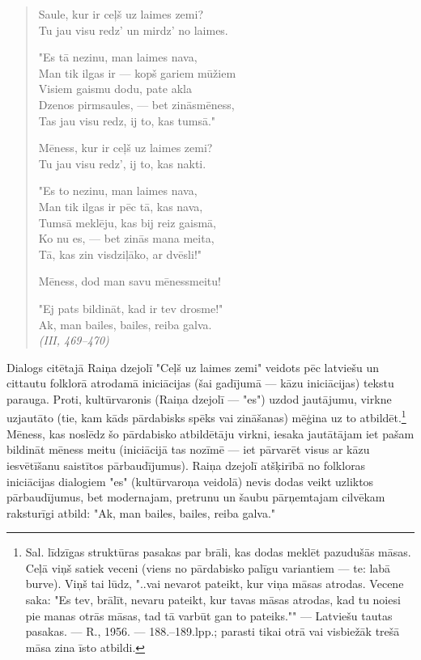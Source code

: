 \documentclass[11pt]{article}
\begin{document}
{\begin{quote}
Saule, kur ir ceļš uz laimes zemi?\\
Tu jau visu redz' un mirdz' no laimes.

"Es tā nezinu, man laimes nava,\\
Man tik ilgas ir --- kopš gariem mūžiem\\
Visiem gaismu dodu, pate akla\\
Dzenos pirmsaules, --- bet zināsmēness,\\
Tas jau visu redz, ij to, kas tumsā."

Mēness, kur ir ceļš uz laimes zemi?\\
Tu jau visu redz', ij to, kas nakti.

"Es to nezinu, man laimes nava,\\
Man tik ilgas ir pēc tā, kas nava,\\
Tumsā meklēju, kas bij reiz gaismā,\\
Ko nu es, --- bet zinās mana meita,\\
Tā, kas zin visdziļāko, ar dvēsli!"

Mēness, dod man savu mēnessmeitu!

"Ej pats bildināt, kad ir tev drosme!"\\
Ak, man bailes, bailes, reiba galva.\\
{\em (III, 469--470)}
\end{quote}

Dialogs citētajā Raiņa dzejolī "Ceļš uz laimes
zemi" veidots pēc latviešu un cittautu folklorā
atrodamā iniciācijas (šai gadījumā --- kāzu
iniciācijas) tekstu parauga. Proti, kultūrvaronis
(Raiņa dzejolī --- "es") uzdod jautājumu,
virkne uzjautāto (tie, kam kāds pārdabisks spēks
vai zināšanas) mēģina uz to atbildēt.\footnote{Sal.
līdzīgas struktūras pasakas par brāli, kas dodas
meklēt pazudušās māsas. Ceļā viņš satiek veceni
(viens no pārdabisko palīgu variantiem --- te:
labā burve). Viņš tai lūdz, "..vai nevarot
pateikt, kur viņa māsas atrodas. Vecene saka:
"Es tev, brālīt, nevaru pateikt, kur tavas
māsas atrodas, kad tu noiesi pie manas otrās māsas,
tad tā varbūt gan to pateiks."" --- Latviešu tautas
pasakas. --- R., 1956. --- 188.--189.lpp.; parasti
tikai otrā vai visbiežāk trešā māsa zina īsto
atbildi.}
Mēness, kas noslēdz šo pārdabisko atbildētāju virkni,
iesaka jautātājam iet pašam bildināt mēness meitu
(iniciācijā tas nozīmē --- iet pārvarēt visus
ar kāzu iesvētīšanu saistītos pārbaudījumus).
Raiņa dzejolī atšķirībā no folkloras iniciācijas
dialogiem "es" (kultūrvaroņa veidolā) nevis dodas
veikt uzliktos pārbaudījumus, bet modernajam,
pretrunu un šaubu pārņemtajam cilvēkam raksturīgi
atbild: "Ak, man bailes, bailes, reiba galva."

}
\end{document}
